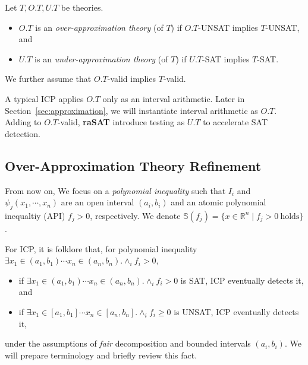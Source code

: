 \documentclass[runningheads,a4paper,oribibl]{llncs}
\newcommand{\Real}{{\mathbb R}}
\begin{document}
\begin{definition} \label{def:ApproxTheory}
Let $T, O.T, U.T$ be theories. 
\begin{itemize}
\item $O.T$ is an {\em over-approximation theory} (of $T$) 
if $O.T$-UNSAT implies $T$-UNSAT, and
\item $U.T$ is an {\em under-approximation theory} (of $T$)
if $U.T$-SAT implies $T$-SAT. 
\end{itemize}
We further assume that $O.T$-valid implies $T$-valid. 
\end{definition}

A typical ICP applies $O.T$ only as an interval arithmetic. 
Later in Section~\ref{sec:approximation}, we will instantiate interval arithmetic as $O.T$. 
Adding to $O.T$-valid, {\bf raSAT} introduce testing as $U.T$ to accelerate SAT detection. 



\subsection{Over-Approximation Theory Refinement}
\label{sec:soundness}

From now on, We focus on a \emph{polynomial inequality} such that 
$I_i$ and $\psi_j(x_1,\cdots,x_n)$ are an open interval $(a_i,b_i)$ and 
an atomic polynomial inequaltiy (API) $f_j > 0$, respectively. 
We denote $\mathbb{S}(f_j) = \{x \in \Real^n \mid f_j > 0 ~\text{holds}\}$.

For ICP, it is folklore that, for polynomial inequality 
$\exists x_1 \in (a_1,b_1) \cdots x_n \in (a_n,b_n) . \wedge_{i} f_i > 0$, 
\begin{itemize}
\item if $\exists x_1 \in (a_1,b_1) \cdots x_n \in (a_n,b_n) . \wedge_{i} f_i > 0$ is SAT, 
ICP eventually detects it, and 
\item if $\exists x_1 \in [a_1,b_1] \cdots x_n \in [a_n,b_n] . \wedge_{i} f_i \geq 0$ is UNSAT, 
ICP eventually detects it, 
\end{itemize}
under the assumptions of {\em fair} decomposition and bounded intervals $(a_i,b_i)$. 
We will prepare terminology and briefly review this fact. 
\end{document}
